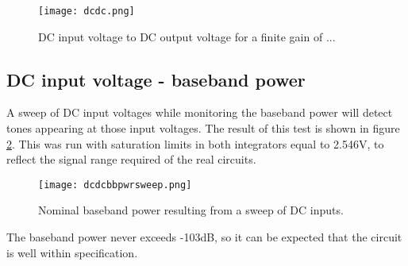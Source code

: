         \begin{figure}
            \begin{center}
            \texttt{[image: dcdc.png]}
            \label{fig:dcdc}
            \caption{DC input voltage to DC output voltage for a finite gain of ...} %
            \end{center}
        \end{figure}       

        \subsection{DC input voltage - baseband power}
        \label{Verification:DCbbpwr}
        A sweep of DC input voltages while monitoring the baseband power will detect tones appearing at those input voltages.
        The result of this test is shown in figure \ref{fig:dcdcbbpwr}.
        This was run with saturation limits in both integrators equal to 2.546V, to reflect the signal range required of the real circuits.

         \begin{figure}
            \begin{center}
            \texttt{[image: dcdcbbpwrsweep.png]}
            \label{fig:dcdcbbpwr}
            \caption{Nominal baseband power resulting from a sweep of DC inputs.}
            \end{center}
        \end{figure}       
        
        The baseband power never exceeds -103dB, so it can be expected that the circuit is well within specification.


%
%

